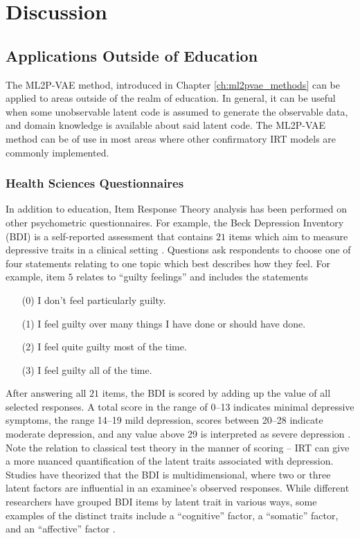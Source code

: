 \chapter{Discussion}\label{ch:conclusion}

\section{Applications Outside of Education}\label{sec:related_work}
The ML2P-VAE method, introduced in Chapter \ref{ch:ml2pvae_methods} can be applied to areas outside of the realm of education. In general, it can be useful when some unobservable latent code is assumed to generate the observable data, and domain knowledge is available about said latent code. The ML2P-VAE method can be of use in most areas where other confirmatory IRT models are commonly implemented. 

\subsection{Health Sciences Questionnaires}
In addition to education, Item Response Theory analysis has been performed on other psychometric questionnaires. For example, the Beck Depression Inventory (BDI) is a self-reported assessment that contains $21$ items which aim to measure depressive traits in a clinical setting \cite{beck1996}. Questions ask respondents to choose one of four statements relating to one topic which best describes how they feel. For example, item $5$ relates to ``guilty feelings'' and includes the statements
\begin{itemize}
  \item[(0)] I don't feel particularly guilty.
  \item[(1)] I feel guilty over many things I have done or should have done.
  \item[(2)] I feel quite guilty most of the time.
  \item[(3)] I feel guilty all of the time.
\end{itemize}

After answering all $21$ items, the BDI is scored by adding up the value of all selected responses. A total score in the range of 0--13 indicates minimal depressive symptoms, the range 14--19 mild depression, scores between 20--28 indicate moderate depression, and any value above 29 is interpreted as severe depression \cite{smarr2011}. Note the relation to classical test theory in the manner of scoring -- IRT can give a more nuanced quantification of the latent traits associated with depression. Studies have theorized that the BDI is multidimensional, where two or three latent factors are influential in an examinee's observed responses. While different researchers have grouped BDI items by latent trait in various ways, some examples of the distinct traits include a ``cognitive'' factor, a ``somatic'' factor, and an ``affective'' factor \cite{huang2015}.

